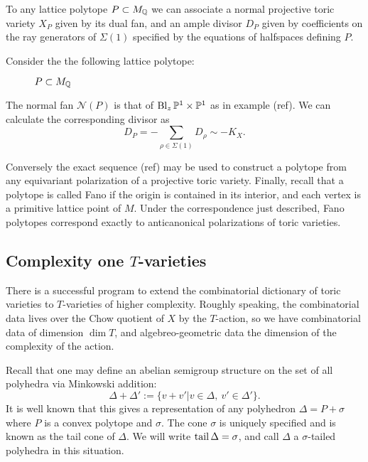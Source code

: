 To any lattice polytope \(P \subset M_{\mathbb{Q}}\) we can associate a normal projective toric variety \(X_P\) given by its dual fan, and an ample divisor \(D_P\) given by coefficients on the ray generators of \(\Sigma(1)\) specified by the equations of halfspaces defining \(P\).
\begin{example}
Consider the the following lattice polytope:
\begin{figure}[h]
\centering
	\caption{$P \subset M_{\mathbb{Q}}$}
\end{figure}
The normal fan \(\mathcal{N}(P)\) is that of \(\operatorname{Bl}_z \mathbb{P}^1 \times \mathbb{P}^1\) as in example (ref). We can calculate the corresponding divisor as
\[
D_P = - \sum_{\rho \in \Sigma(1)} D_\rho \sim -K_X.
\]
\end{example}
Conversely the exact sequence (ref) may be used to construct a polytope from any equivariant polarization of a projective toric variety. Finally, recall that a polytope is called Fano if the origin is contained in its interior, and each vertex is a primitive lattice point of \(M\). Under the correspondence just described, Fano polytopes correspond exactly to anticanonical polarizations of toric varieties.
\subsection{Complexity one $T$-varieties}
There is a successful program to extend the combinatorial dictionary of toric varieties to \(T\)-varieties of higher complexity. Roughly speaking, the combinatorial data lives over the Chow quotient of \(X\) by the \(T\)-action, so we have combinatorial data of dimension \(\dim T\), and algebreo-geometric data the dimension of the complexity of the action.

Recall that one may define an abelian semigroup structure on the set of all polyhedra via Minkowski addition:
\[
\Delta + \Delta' := \{ v + v' | v \in \Delta, \ v' \in \Delta' \}.
\]
It is well known that this gives a representation of any polyhedron \(\Delta = P + \sigma \) where \(P\) is a convex polytope and \(\sigma\). The cone \(\sigma\) is uniquely specified and is known as the tail cone of \(\Delta\). We will write \(\operatorname{tail} \Delta = \sigma\), and call \(\Delta\) a \(\sigma\)-tailed polyhedra in this situation.

